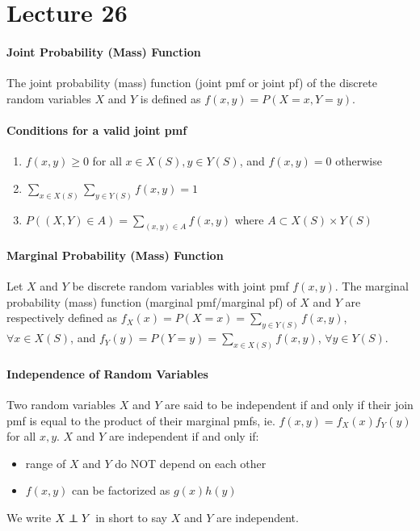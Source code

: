 \documentclass[10pt,letter]{article}
\newcommand\independent{\protect\mathpalette{\protect\independenT}{\perp}}
\def\independenT#1#2{\mathrel{\rlap{$#1#2$}\mkern2mu{#1#2}}}
\begin{document}
\section*{Lecture 26}
\paragraph{Joint Probability (Mass) Function}
The joint probability (mass) function (joint pmf or joint pf) of the discrete random variables $X$ and $Y$ is defined as $f(x,y)=P(X=x,Y=y)$. 
\paragraph{Conditions for a valid joint pmf}
\begin{enumerate}
    \item $f(x,y)\geq0$ for all $x\in X(S),y\in Y(S)$, and $f(x,y)=0$ otherwise 
    \item $\sum_{x\in X(S)}\sum_{y\in Y(S)}f(x,y)=1$ 
    \item $P((X,Y)\in A)=\sum_{(x,y)\in A}f(x,y)$ where $A\subset X(S)\times Y(S)$
\end{enumerate}

\paragraph{Marginal Probability (Mass) Function}
Let $X$ and $Y$ be discrete random variables with joint pmf $f(x,y)$. The marginal probability (mass) function (marginal pmf/marginal pf) of $X$ and $Y$ are respectively defined as $f_X(x)=P(X=x)=\sum_{y\in Y(S)}f(x,y)$, $\forall x\in X(S)$, and $f_Y(y)=P(Y=y)=\sum_{x\in X(S)}f(x,y)$, $\forall y\in Y(S)$.

\paragraph{Independence of Random Variables}
Two random variables $X$ and $Y$ are said to be independent if and only if their join pmf is equal to the product of their marginal pmfs, ie. $f(x,y)=f_X(x)f_Y(y)$ for all $x,y$. $X$ and $Y$ are independent if and only if:
\begin{itemize}
    \item range of $X$ and $Y$ do NOT depend on each other 
    \item $f(x,y)$ can be factorized as $g(x)h(y)$ 
\end{itemize}
We write $X\independent Y$ in short to say $X$ and $Y$ are independent.
\end{document}
